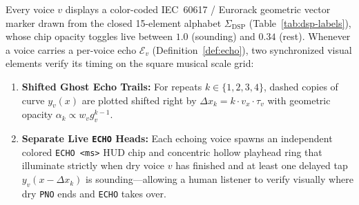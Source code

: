 \begin{definition}
Every voice $v$ displays a color-coded IEC~60617 / Eurorack geometric vector marker drawn from the closed 15-element alphabet $\Sigma_{\mathrm{DSP}}$ (Table~\ref{tab:dsp-labels}), whose chip opacity toggles live between $1.0$ (sounding) and $0.34$ (rest). Whenever a voice carries a per-voice echo $\mathcal{E}_v$ (Definition~\ref{def:echo}), two synchronized visual elements verify its timing on the square musical scale grid:
\begin{enumerate}[leftmargin=1.5em]
  \item \textbf{Shifted Ghost Echo Trails:} For repeats $k \in \{1, 2, 3, 4\}$, dashed copies of curve $y_v(x)$ are plotted shifted right by $\Delta x_k = k \cdot v_x \cdot \tau_v$ with geometric opacity $\alpha_k \propto w_v g_v^{k-1}$.
  \item \textbf{Separate Live \texttt{ECHO} Heads:} Each echoing voice spawns an independent colored \texttt{ECHO <ms>} HUD chip and concentric hollow playhead ring that illuminate strictly when dry voice $v$ has finished and at least one delayed tap $y_v(x - \Delta x_k)$ is sounding—allowing a human listener to verify visually where dry \texttt{PNO} ends and \texttt{ECHO} takes over.
\end{enumerate}
\end{definition}

